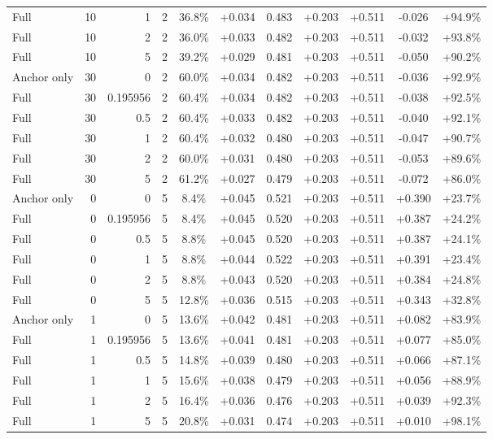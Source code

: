 \begin{table}[htbp]
\begin{tabular}{lrrrccccccc}
Full & 10 & 1 & 2 & 36.8\% & +0.034 & 0.483 & +0.203 & +0.511 & -0.026 & +94.9\% \\
Full & 10 & 2 & 2 & 36.0\% & +0.033 & 0.482 & +0.203 & +0.511 & -0.032 & +93.8\% \\
Full & 10 & 5 & 2 & 39.2\% & +0.029 & 0.481 & +0.203 & +0.511 & -0.050 & +90.2\% \\
Anchor only & 30 & 0 & 2 & 60.0\% & +0.034 & 0.482 & +0.203 & +0.511 & -0.036 & +92.9\% \\
Full & 30 & 0.195956 & 2 & 60.4\% & +0.034 & 0.482 & +0.203 & +0.511 & -0.038 & +92.5\% \\
Full & 30 & 0.5 & 2 & 60.4\% & +0.033 & 0.482 & +0.203 & +0.511 & -0.040 & +92.1\% \\
Full & 30 & 1 & 2 & 60.4\% & +0.032 & 0.480 & +0.203 & +0.511 & -0.047 & +90.7\% \\
Full & 30 & 2 & 2 & 60.0\% & +0.031 & 0.480 & +0.203 & +0.511 & -0.053 & +89.6\% \\
Full & 30 & 5 & 2 & 61.2\% & +0.027 & 0.479 & +0.203 & +0.511 & -0.072 & +86.0\% \\
Anchor only & 0 & 0 & 5 & 8.4\% & +0.045 & 0.521 & +0.203 & +0.511 & +0.390 & +23.7\% \\
Full & 0 & 0.195956 & 5 & 8.4\% & +0.045 & 0.520 & +0.203 & +0.511 & +0.387 & +24.2\% \\
Full & 0 & 0.5 & 5 & 8.8\% & +0.045 & 0.520 & +0.203 & +0.511 & +0.387 & +24.1\% \\
Full & 0 & 1 & 5 & 8.8\% & +0.044 & 0.522 & +0.203 & +0.511 & +0.391 & +23.4\% \\
Full & 0 & 2 & 5 & 8.8\% & +0.043 & 0.520 & +0.203 & +0.511 & +0.384 & +24.8\% \\
Full & 0 & 5 & 5 & 12.8\% & +0.036 & 0.515 & +0.203 & +0.511 & +0.343 & +32.8\% \\
Anchor only & 1 & 0 & 5 & 13.6\% & +0.042 & 0.481 & +0.203 & +0.511 & +0.082 & +83.9\% \\
Full & 1 & 0.195956 & 5 & 13.6\% & +0.041 & 0.481 & +0.203 & +0.511 & +0.077 & +85.0\% \\
Full & 1 & 0.5 & 5 & 14.8\% & +0.039 & 0.480 & +0.203 & +0.511 & +0.066 & +87.1\% \\
Full & 1 & 1 & 5 & 15.6\% & +0.038 & 0.479 & +0.203 & +0.511 & +0.056 & +88.9\% \\
Full & 1 & 2 & 5 & 16.4\% & +0.036 & 0.476 & +0.203 & +0.511 & +0.039 & +92.3\% \\
Full & 1 & 5 & 5 & 20.8\% & +0.031 & 0.474 & +0.203 & +0.511 & +0.010 & +98.1\% \\

\end{tabular}
\end{table}

